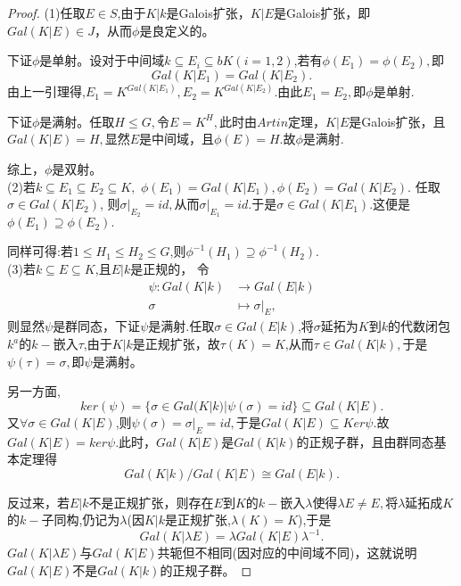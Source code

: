\documentclass[UTF8]{article}
\begin{document}
\begin{proof}
	(1)任取$E\in S$,由于$K|k$是Galois扩张，$K|E$是Galois扩张，即$Gal(K|E)\in J$，从而$\phi$是良定义的。
	
	下证$\phi$是单射。设对于中间域$k\subseteq E_{i}\subseteq b K(i=1,2)$,若有$\phi(E_{1})=\phi(E_{2}),$即
	$$
	Gal(K|E_{1})=Gal(K|E_{2}).
	$$
	由上一引理得,$E_{1}=K^{Gal(K|E_{1})},E_{2}=K^{Gal(K|E_{2})}$.由此$E_{1}=E_{2},$即$\phi$是单射.
	
	下证$\phi$是满射。任取$H\leq G,$令$E=K^{H},$此时由$Artin$定理，$K|E$是Galois扩张，且$Gal(K|E)=H,$显然$E$是中间域，且$\phi(E)=H.$故$\phi$是满射.
	
	综上，$\phi$是双射。\\
	(2)若$k\subseteq E_{1}\subseteq E_{2}\subseteq K,$
	$\phi(E_{1})=Gal(K|E_{1}),\phi(E_{2})=Gal(K|E_{2}).$
	任取$\sigma \in Gal(K|E_{2})$,
	则$\sigma|_{E_{2}}=id,$从而$\sigma|_{E_{1}}=id.$于是$\sigma \in Gal(K|E_{1}).$这便是$\phi(E_{1})\supseteq \phi(E_{2}).$
	
	同样可得:若$1\leq H_{1}\leq H_{2}\leq G$,则$\phi^{-1}(H_{1})\supseteq \phi^{-1}(H_{2}).$\\
	(3)若$k\subseteq E\subseteq K$,且$E|k$是正规的，
	令
	\[
	\begin{split}
	\psi:Gal(K|k)&\rightarrow Gal(E|k)\\
	\sigma &\mapsto \sigma|_{E},
	\end{split}
	\]
	则显然$\psi$是群同态，下证$\psi$是满射.任取$\sigma \in Gal(E|k)$,将$\sigma$延拓为$K$到$k$的代数闭包$k^{a}$的$k-$嵌入$\tau$,由于$K|k$是正规扩张，故$\tau(K)=K$,从而$\tau\in Gal(K|k),$于是$\psi(\tau)=\sigma ,$即$\psi$是满射。
	
	另一方面,
	$$
	ker(\psi)=\{\sigma \in Gal(K|k)|\psi(\sigma)=id\}\subseteq Gal(K|E).
	$$
	又$\forall \sigma \in Gal(K|E)$,则$\psi(\sigma)=\sigma|_{E}=id,$于是$Gal(K|E)\subseteq Ker\psi.$故$Gal(K|E)=ker\psi.$此时，$Gal(K|E)$是$Gal(K|k)$的正规子群，且由群同态基本定理得
	$$
	Gal(K|k)/Gal(K|E)\cong Gal(E|k).
	$$
	
	反过来，若$E|k$不是正规扩张，则存在$E$到$K$的$k-$嵌入$\lambda$使得$\lambda E\neq E,$将$\lambda$延拓成$K$的$k-$子同构,仍记为$\lambda$(因$K|k$是正规扩张,$\lambda(K)=K$),于是
	$$Gal(K|\lambda E)=\lambda Gal(K|E)\lambda^{-1}.$$
	$Gal(K|\lambda E)$与$Gal(K|E)$共轭但不相同(因对应的中间域不同)，这就说明$Gal(K|E)$不是$Gal(K|k)$的正规子群。
	

\end{proof}
\end{document}
